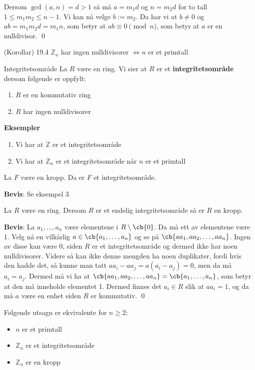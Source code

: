 Dersom $\gcd(a, n) = d > 1$ så må $a = m_1d$ og $n = m_2d$ for to tall $1 \leq m_1m_2\leq n-1$.
Vi kan nå velge $b:= m_2$. Da har vi at $b \neq 0$ og $ab=m_1m_2d=m_1n$, som betyr at 
$ab\equiv 0 \pmod{n}$, som betyr at $a$ er en nulldivisor. \qed

\begin{theorem*}{(Korollar) 19.4}{}
  $\mathbb{Z}_n$ har ingen nulldivisorer $\iff n$ er et primtall 
\end{theorem*}

\begin{definition}{Integritetsområde}{}
  La $R$ være en ring. Vi sier at $R$ er et \textbf{integritetsområde} dersom følgende er oppfylt:
  \begin{enumerate}
    \item $R$ er en kommutativ ring
    \item $R$ har ingen nulldivisorer
  \end{enumerate}
\end{definition}

\textbf{Eksempler}
\begin{enumerate}
  \item Vi har at $\mathbb{Z}$ er et integritetsområde
  \item Vi har at $\mathbb{Z}_n$ er et integritetsområde når $n$ er et primtall
\end{enumerate}

\begin{theorem*}{19.9}{}
  La $F$ være en kropp. Da er $F$ et integritetsområde.
\end{theorem*}
\textbf{Bevis}: Se eksempel 3

\begin{theorem*}{19.11}{}
  La $R$ være en ring. Dersom $R$ er et endelig integritetsområde så er $R$ en kropp. 
\end{theorem*}

\textbf{Bevis}: La $a_1, \dots, a_n$ være elementene i $R\setminus \cb{0}$. Da må ett av elementene
være 1. Velg nå en vilkårlig $a \in \cb{a_1, \dots, a_n}$ og se på 
$\cb{aa_1, aa_2, \dots, aa_n}$. Ingen av disse kan være 0, siden $R$ er et integritetsområde og
dermed ikke har noen nulldivisorer. Videre så kan ikke denne mengden ha noen duplikater, fordi
hvis den hadde det, så kunne man tatt $aa_i - aa_j = a(a_i - a_j) = 0$, men da må $a_i = a_j$. 
Dermed må vi ha at $\cb{aa_1, aa_2, \dots, aa_n} = \cb{a_1, \dots, a_n}$, som betyr at
den må inneholde elementet 1. Dermed finnes det $a_i\in R$ slik at $aa_i = 1$, og da må
$a$ være en enhet siden $R$ er kommutativ. \qed

\begin{theorem*}{19.12}{}
  Følgende utsagn er ekvivalente for $n \geq 2$: 
  \begin{itemize}
    \item $n$ er et primtall
    \item $\mathbb{Z}_n$ er et integritetsområde
    \item $\mathbb{Z}_n$ er en kropp
  \end{itemize}
\end{theorem*}

